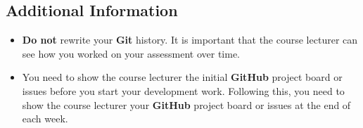 \documentclass{article}
\begin{document}
\subsection*{Additional Information}
\begin{itemize}
    \item \textbf{Do not} rewrite your \textbf{Git} history. It is important that the course lecturer can see how you worked on your assessment over time. 
    \item You need to show the course lecturer the initial \textbf{GitHub} project board or issues before you start your development work. Following this, you need to show the course lecturer your \textbf{GitHub} project board or issues at the end of each week.
\end{itemize} 
\end{document}
